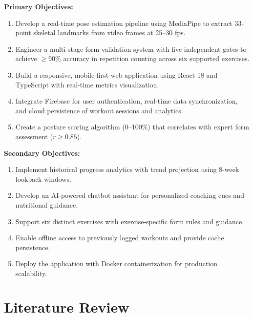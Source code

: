 \documentclass[12pt,a4paper]{article}
\begin{document}
\textbf{Primary Objectives:}

\begin{enumerate}[noitemsep, topsep=2pt]
  \item Develop a real-time pose estimation pipeline using MediaPipe to extract 
        33-point skeletal landmarks from video frames at 25--30 fps.
  
  \item Engineer a multi-stage form validation system with five independent gates 
        to achieve $\geq$90\% accuracy in repetition counting across six supported 
        exercises.
  
  \item Build a responsive, mobile-first web application using React 18 and 
        TypeScript with real-time metrics visualization.
  
  \item Integrate Firebase for user authentication, real-time data synchronization, 
        and cloud persistence of workout sessions and analytics.
  
  \item Create a posture scoring algorithm (0--100\%) that correlates with expert 
        form assessment ($r \geq 0.85$).
\end{enumerate}

\textbf{Secondary Objectives:}

\begin{enumerate}[noitemsep, topsep=2pt]
  \item Implement historical progress analytics with trend projection using 
        8-week lookback windows.
  
  \item Develop an AI-powered chatbot assistant for personalized coaching cues 
        and nutritional guidance.
  
  \item Support six distinct exercises with exercise-specific form rules and 
        guidance.
  
  \item Enable offline access to previously logged workouts and provide cache 
        persistence.
  
  \item Deploy the application with Docker containerization for production 
        scalability.
\end{enumerate}

\section{Literature Review}
\end{document}
